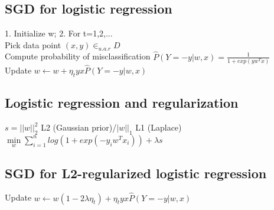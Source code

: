 
\subsection*{SGD for logistic regression}
1. Initialize w; 2. For t=1,2,...\\
Pick data point $(x,y) \in_{u.a.r} D$\\
Compute probability of misclassification $\hat{P}(Y = -y|w,x) = \frac{1}{1+exp(yw^Tx)}$\\
Update $w \leftarrow w + \eta_t y x \hat{P}(Y = -y|w,x)$

\subsection*{Logistic regression and regularization}
$s = ||w||_2^2$ L2 (Gaussian prior)/$|w||_1$ L1 (Laplace)\\
$\underset{w}{\operatorname{min}} \sum_{i=1}^n log(1+exp(-y_i w^T x_i)) + \lambda s$

\subsection*{SGD for L2-regularized logistic regression}
Update $w \leftarrow w (1-2\lambda \eta_t) + \eta_t y x \hat{P}(Y = -y|w,x)$